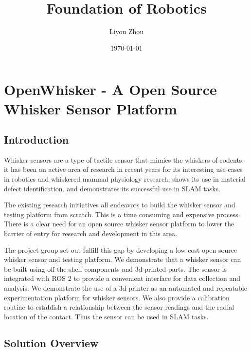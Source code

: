 \documentclass{report}
\title{Foundation of Robotics}
\author{Liyou Zhou}
\date{\today}
\begin{document}
\maketitle
\tableofcontents

\chapter{OpenWhisker - A Open Source Whisker Sensor Platform}

\section{Introduction}

Whisker sensors are a type of tactile sensor that mimics the whiskers of rodents. it has been an active area of research in recent years for its interesting use-cases in robotics and whiskered mammal physiology research\cite{prescottActiveTouchSensing2020}. \cite{fotouhiDetectionBarelyVisible2021} shows its use in material defect identification. \cite{struckmeierViTaSLAMBioinspiredVisuoTactile2019} and \cite{foxTactileSLAMBiomimetic2012} demonstrates its successful use in SLAM tasks.

The existing research initiatives all endeavors to build the whisker sensor and testing platform from scratch. This is a time consuming and expensive process. There is a clear need for an open source whisker sensor platform to lower the barrier of entry for research and development in this area.

The project group set out fulfill this gap by developing a low-cost open source whisker sensor and testing platform. We demonstrate that a whisker sensor can be built using off-the-shelf components and 3d printed parts. The sensor is integrated with ROS 2 to provide a convenient interface for data collection and analysis. We demonstrate the use of a 3d printer as an automated and repeatable experimentation platform for whisker sensors. We also provide a calibration routine to establish a relationship between the sensor readings and the radial location of the contact. Thus the sensor can be used in SLAM tasks.

\section{Solution Overview}
\end{document}
